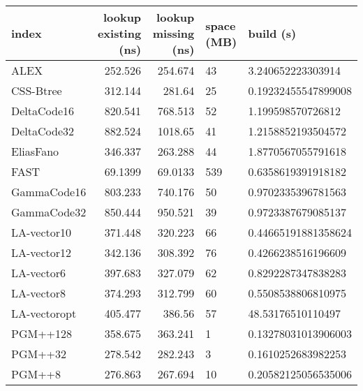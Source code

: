 \begin{tabular}{lrrll}
\hline
 index             &   lookup existing (ns) &   lookup missing (ns) & space (MB)   & build (s)             \\
\hline
 ALEX              &               252.526  &              254.674  & 43           & 3.240652223303914     \\
 CSS-Btree         &               312.144  &              281.64   & 25           & 0.19232455547899008   \\
 DeltaCode16       &               820.541  &              768.513  & 52           & 1.199598570726812     \\
 DeltaCode32       &               882.524  &             1018.65   & 41           & 1.2158852193504572    \\
 EliasFano         &               346.337  &              263.288  & 44           & 1.8770567055791618    \\
 FAST              &                69.1399 &               69.0133 & 539          & 0.6358619391918182    \\
 GammaCode16       &               803.233  &              740.176  & 50           & 0.9702335396781563    \\
 GammaCode32       &               850.444  &              950.521  & 39           & 0.9723387679085137    \\
 LA-vector10       &               371.448  &              320.223  & 66           & 0.44665191881358624   \\
 LA-vector12       &               342.136  &              308.392  & 76           & 0.4266238516196609    \\
 LA-vector6        &               397.683  &              327.079  & 62           & 0.8292287347838283    \\
 LA-vector8        &               374.293  &              312.799  & 60           & 0.5508538806810975    \\
 LA-vectoropt      &               405.477  &              386.56   & 57           & 48.53176510110497     \\
 PGM++128          &               358.675  &              363.241  & 1            & 0.13278031013906003   \\
 PGM++32           &               278.542  &              282.243  & 3            & 0.1610252683982253    \\
 PGM++8            &               276.863  &              267.694  & 10           & 0.20582125056535006   \\

\end{tabular}
